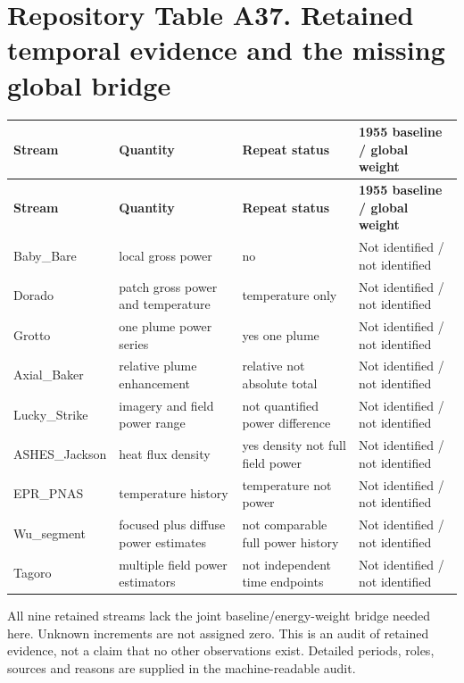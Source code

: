 \documentclass[11pt,a4paper]{article}
\begin{document}
\section*{Repository Table A37. Retained temporal evidence and the missing global bridge}
{\fontsize{8.3}{10.1}\selectfont\begin{longtable}{>{\raggedright\arraybackslash}p{27.461mm}>{\raggedright\arraybackslash}p{56.537mm}>{\raggedright\arraybackslash}p{29.076mm}>{\raggedright\arraybackslash}p{48.460mm}}\toprule
\textbf{Stream} & \textbf{Quantity} & \textbf{Repeat status} & \textbf{1955 baseline /\allowbreak{} global weight}\\\midrule\endfirsthead
\textbf{Stream} & \textbf{Quantity} & \textbf{Repeat status} & \textbf{1955 baseline /\allowbreak{} global weight}\\\midrule\endhead
\bottomrule\endfoot
Baby\_\allowbreak{}Bare & local gross power & no & Not identified /\allowbreak{} not identified\\
Dorado & patch gross power and temperature & temperature only & Not identified /\allowbreak{} not identified\\
Grotto & one plume power series & yes one plume & Not identified /\allowbreak{} not identified\\
Axial\_\allowbreak{}Baker & relative plume enhancement & relative not absolute total & Not identified /\allowbreak{} not identified\\
Lucky\_\allowbreak{}Strike & imagery and field power range & not quantified power difference & Not identified /\allowbreak{} not identified\\
ASHES\_\allowbreak{}Jackson & heat flux density & yes density not full field power & Not identified /\allowbreak{} not identified\\
EPR\_\allowbreak{}PNAS & temperature history & temperature not power & Not identified /\allowbreak{} not identified\\
Wu\_\allowbreak{}segment & focused plus diffuse power estimates & not comparable full power history & Not identified /\allowbreak{} not identified\\
Tagoro & multiple field power estimators & not independent time endpoints & Not identified /\allowbreak{} not identified\\
\end{longtable}}
All nine retained streams lack the joint baseline/\allowbreak{}energy-weight bridge needed here. Unknown increments are not assigned zero. This is an audit of retained evidence, not a claim that no other observations exist. Detailed periods, roles, sources and reasons are supplied in the machine-readable audit.\par
\clearpage
\end{document}
